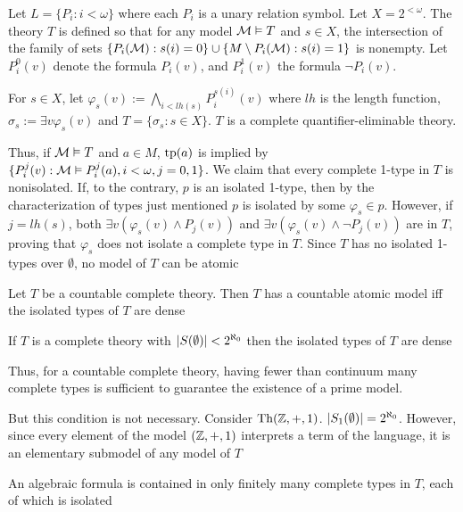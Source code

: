 \documentclass[11pt]{article}
\begin{document}
\begin{examplle}
Let \(L=\{P_i:i<\omega\}\) where each \(P_i\) is a unary relation symbol. Let \(X=2^{<\omega}\). The
theory \(T\) is defined so that for any model \(\mathcal{M}\vDash T\) and \(s\in X\), the intersection of the
family of sets \(\{P_i(\mathcal{M}):s(i)=0\}\cup\{M\setminus P_i(\mathcal{M}):s(i)=1\}\) is nonempty. Let \(P^0_i(v)\) denote the
formula \(P_i(v)\), and \(P_i^1(v)\) the formula \(\neg P_i(v)\).

For \(s\in X\), let \(\varphi_s(v):=\bigwedge_{i<lh(s)}P_i^{s(i)}(v)\) where \(lh\) is the length function, \(\sigma_s:=\exists v\varphi_s(v)\)
and \(T=\{\sigma_s:s\in X\}\). \(T\) is a complete quantifier-eliminable theory.

Thus, if \(\mathcal{M}\vDash T\) and \(a\in M\), \(\operatorname{tp}(a)\) is implied by \(\{P_i^j(v):\mathcal{M}\vDash P_i^j(a),i<\omega,j=0,1\}\). We
claim that every complete 1-type in \(T\) is nonisolated. If, to the contrary, \(p\) is an
isolated 1-type, then by the characterization of types just mentioned \(p\) is isolated by
some \(\varphi_s\in p\). However, if \(j=lh(s)\), both \(\exists v(\varphi_s(v)\wedge P_j(v))\)
and \(\exists v(\varphi_s(v)\wedge\neg P_j(v))\) are in \(T\), proving that \(\varphi_s\) does not isolate a complete type
in \(T\). Since \(T\) has no isolated 1-types over \(\emptyset\), no model of \(T\) can be atomic
\end{examplle}

\begin{proposition}[]
Let \(T\) be a countable complete theory. Then \(T\) has a countable atomic model iff the
isolated types of \(T\) are dense
\end{proposition}

\begin{lemma}[]
If \(T\) is a complete theory with \(\abs{S(\emptyset)}<2^{\aleph_0}\) then the isolated types of \(T\) are dense
\end{lemma}

Thus, for a countable complete theory, having fewer than continuum many complete types is
sufficient to guarantee the existence of a prime model.

But this condition is not necessary. Consider \(\operatorname{Th}(\mathbb{Z},+,1)\). \(\abs{S_1(\emptyset)}=2^{\aleph_0}\). However,
since every element of the model \((\mathbb{Z},+,1)\) interprets a term of the language, it is an
elementary submodel of any model of \(T\)

\begin{remark}
An algebraic formula is contained in only finitely many complete types in \(T\), each of which
is isolated
\end{remark}
\end{document}
